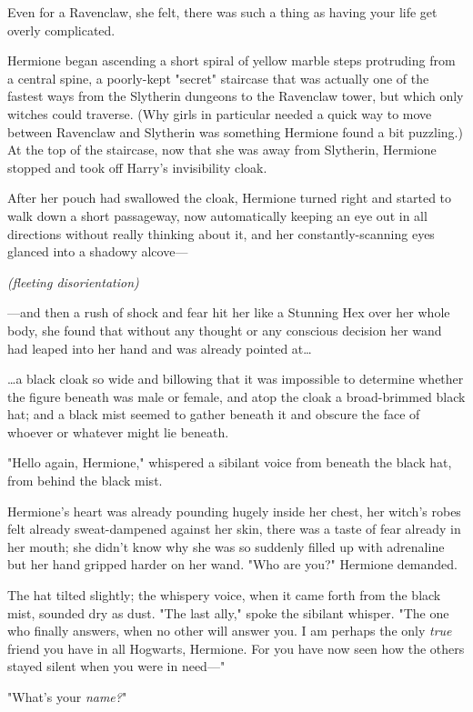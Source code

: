 Even for a Ravenclaw, she felt, there was such a thing as having your life get
overly complicated.

Hermione began ascending a short spiral of yellow marble steps protruding from
a central spine, a poorly-kept "secret" staircase that was actually one of the
fastest ways from the Slytherin dungeons to the Ravenclaw tower, but which
only witches could traverse. (Why girls in particular needed a quick way to
move between Ravenclaw and Slytherin was something Hermione found a bit
puzzling.) At the top of the staircase, now that she was away from Slytherin,
Hermione stopped and took off Harry's invisibility cloak.

After her pouch had swallowed the cloak, Hermione turned right and started to
walk down a short passageway, now automatically keeping an eye out in all
directions without really thinking about it, and her constantly-scanning eyes
glanced into a shadowy alcove---

\emph{(fleeting disorientation)}

---and then a rush of shock and fear hit her like a Stunning Hex over her whole
body, she found that without any thought or any conscious decision her wand had
leaped into her hand and was already pointed at{\ldots}

{\ldots}a black cloak so wide and billowing that it was impossible to determine
whether the figure beneath was male or female, and atop the cloak a
broad-brimmed black hat; and a black mist seemed to gather beneath it and
obscure the face of whoever or whatever might lie beneath.

"Hello again, Hermione," whispered a sibilant voice from beneath the black hat,
from behind the black mist.

Hermione's heart was already pounding hugely inside her chest, her witch's
robes felt already sweat-dampened against her skin, there was a taste of fear
already in her mouth; she didn't know why she was so suddenly filled up with
adrenaline but her hand gripped harder on her wand. "Who are you?" Hermione
demanded.

The hat tilted slightly; the whispery voice, when it came forth from the black
mist, sounded dry as dust. "The last ally," spoke the sibilant whisper. "The
one who finally answers, when no other will answer you. I am perhaps the only
\emph{true} friend you have in all Hogwarts, Hermione. For you have now seen
how the others stayed silent when you were in need---"

"What's your \emph{name?}"

